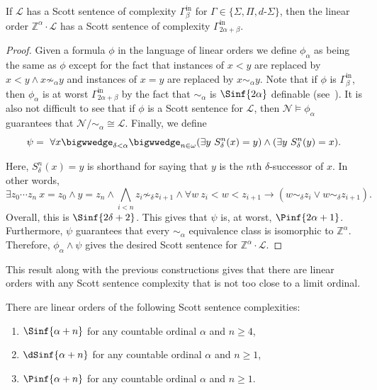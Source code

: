 \documentclass{amsart}
\newcommand{\Z}{\mathbb{Z}}
\newcommand{\N}{\mathcal{N}}
\renewcommand{\L}{\mathcal{L}}
\providecommand{\Ginf}[1]{\Gamma^{\mathrm{in}}_{#1}}
\begin{document}
\begin{lemma}
If $\L$ has a Scott sentence of complexity $\Ginf{\beta}$ for
$\Gamma\in\{\Sigma,\Pi,d\text{-}\Sigma\}$, then the linear order $\Z^\alpha\cdot \L$ has a Scott sentence of complexity $\Ginf{2\alpha+\beta}$.
\end{lemma}

\begin{proof}
Given a formula $\phi$ in the language of linear orders we define $\phi_\alpha$
as being the same as $\phi$ except for the fact that instances of $x<y$ are
replaced by $x<y \land x\not\sim_\alpha y$ and instances of $x=y$ are replaced
by $x\sim_\alpha y$. Note that if $\phi$ is $\Ginf{\beta}$, then $\phi_\alpha$
is at worst $\Ginf{2\alpha+\beta}$ by the fact that $\sim_\alpha$ is
$\Sinf{2\alpha}$ definable (see~\cite[Proposition 4]{AR20}). It is also not
difficult to see that if $\phi$ is a Scott sentence for $\L$, then
$\N\models\phi_\alpha$ guarantees that $\N{/}{\sim_\alpha}\cong \L$. 
Finally, we define
\[\psi= ~ \forall x \bigwwedge_{\delta<\alpha} \bigwwedge_{n\in\omega} (\exists
y\ S_\delta^n(x)=y)\land (\exists y\ S_\delta^n(y)=x).\]

Here, $S_\delta^n(x)=y$ is shorthand for saying that $y$ is the $n$th
$\delta$-successor of $x$. In other words,
\[ \exists z_0\cdots z_{n} ~ x=z_0
\land y=z_n \land \bigwedge_{i<n} z_i\not\sim_\delta z_{i+1} \land \forall w~
z_i<w<z_{i+1} \to (w\sim_\delta z_i \lor w\sim_\delta z_{i+1}).\] 
Overall, this is $\Sinf{2\delta+2}$. This
gives that $\psi$ is, at worst, $\Pinf{2\alpha+1}$. Furthermore, $\psi$
guarantees that every $\sim_\alpha$ equivalence class is isomorphic to
$\Z^\alpha$. Therefore, $\phi_\alpha\land\psi$ gives the desired Scott sentence
for $\Z^\alpha\cdot \L$.
\end{proof}








This result along with the previous constructions gives that there are linear orders with any Scott sentence complexity that is not too close to a limit ordinal.



\begin{corollary}\label{cor:SSCsuccessors}
There are linear orders of the following Scott sentence complexities:
\begin{enumerate}
\item $\Sinf{\alpha+n}$ for any countable ordinal $\alpha$ and $n\geq 4$,
\item $\dSinf{\alpha+n}$ for any countable ordinal $\alpha $ and $n\geq 1$,
\item $\Pinf{\alpha+n}$ for any countable ordinal $\alpha$ and $n\geq 1$.
\end{enumerate}
\end{corollary}
\end{document}

